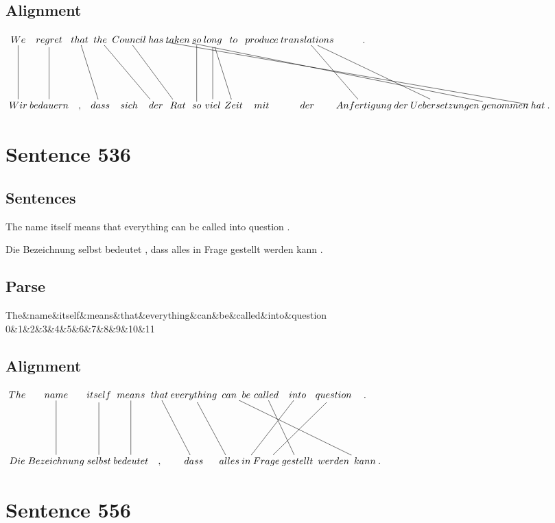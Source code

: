 \documentclass{report}
\begin{document}
\subsection*{Alignment}
\scriptsize{
$
\xymatrix@C-2.3pc{
We \ar @{-} [dd] & regret \ar @{-} [dd] & that \ar @{-} [ddr] & the \ar @{-} [ddrr] & Council \ar @{-} [ddrr] & has \ar @{-} [ddrrrrrrrrrrr] & taken \ar @{-} [ddrrrrrrrrr] & so \ar @{-} [dd] & long \ar @{-} [ddr] \ar @{-} [dd] & to & produce & translations \ar @{-} [ddr] \ar @{-} [ddrrr] & .\\\\
Wir & bedauern & , & dass & sich & der & Rat & so & viel & Zeit & mit & der & Anfertigung & der & Uebersetzungen & genommen & hat & .
}$}
\newpage\section*{Sentence 536}

\subsection*{Sentences}
The name itself means that everything can be called into question .

\noindent Die Bezeichnung selbst bedeutet , dass alles in Frage gestellt werden kann .



\subsection*{Parse}
\begin{dependency}[theme=simple]
\begin{deptext}[column sep=.5cm, row sep=.1ex]
The\&name\&itself\&means\&that\&everything\&can\&be\&called\&into\&question\\
0\&1\&2\&3\&4\&5\&6\&7\&8\&9\&10\&11\\
\end{deptext}
\end{dependency}


\subsection*{Alignment}
\scriptsize{
$
\xymatrix@C-2.3pc{
The & name \ar @{-} [dd] & itself \ar @{-} [dd] & means \ar @{-} [dd] & that \ar @{-} [ddr] & everything \ar @{-} [ddr] & can \ar @{-} [ddrrrrr] & be & called \ar @{-} [ddr] & into \ar @{-} [ddll] & question \ar @{-} [ddll] & .\\\\
Die & Bezeichnung & selbst & bedeutet & , & dass & alles & in & Frage & gestellt & werden & kann & .
}$}
\newpage\section*{Sentence 556}
\end{document}

